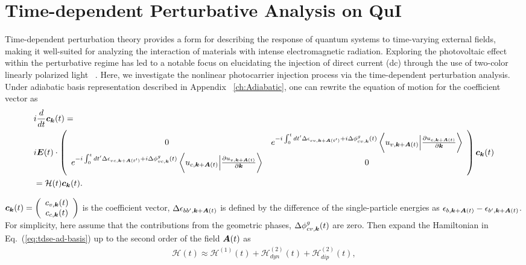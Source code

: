 \section{Time-dependent Perturbative Analysis on QuI \label{sec:deriveperturbation}}
Time-dependent perturbation theory provides a form for describing the response of quantum systems to time-varying external fields, making it well-suited for analyzing the interaction of materials with intense electromagnetic radiation. 
Exploring the photovoltaic effect within the perturbative regime has led to a notable focus on elucidating the injection of direct current (dc) through the use of two-color linearly polarized light ~\cite{PhysRevLett.74.3596,PhysRevLett.76.1703,PhysRevLett.78.306,Sun2010,PhysRevB.100.075202,HeideBoolakeeEcksteinHommelhoff+2021+3701+3707,PhysRevLett.123.067402}. 
Here, we investigate the nonlinear photocarrier injection process via the time-dependent perturbation analysis.
Under adiabatic basis representation described in Appendix ~\ref{ch:Adiabatic}, one can rewrite the equation of motion for the coefficient vector as
\begin{align}
&i\frac{d}{dt} \boldsymbol c_{\boldsymbol k}(t) = 
 \nonumber \\
& i\boldsymbol E(t)\cdot \left(
    \begin{array}{cc}
      0 & 
      e^{-i\int^t_0dt' \Delta \epsilon_{cv,\boldsymbol k+ \boldsymbol A(t')}+i \Delta \phi^g_{cv,\boldsymbol k}(t)} 
  \left \langle u_{v,\boldsymbol k+\boldsymbol A(t)}\Big |\frac{\partial u_{c,\boldsymbol k+\boldsymbol A(t)}}{\partial \boldsymbol k} \right \rangle \\
      e^{-i\int^t_0dt' \Delta \epsilon_{vc,\boldsymbol k+ \boldsymbol A(t')}+i \Delta \phi^g_{vc,\boldsymbol k}(t)} 
  \left \langle u_{c,\boldsymbol k+\boldsymbol A(t)}\Big |\frac{\partial u_{v,\boldsymbol k+\boldsymbol A(t)}}{\partial \boldsymbol k} \right \rangle &
      0
    \end{array}
    \right) \boldsymbol c_{\boldsymbol k}(t) \nonumber \\
&= \mathcal{H}(t) \boldsymbol c_{\boldsymbol k}(t)
.
\label{eq:tdse-ad-basis}
\end{align}

$\boldsymbol c_{\boldsymbol k}(t) = \left(
    \begin{array}{cc}
      c_{v,\boldsymbol k}(t) \\
      c_{c,\boldsymbol k}(t)
    \end{array}
    \right)$ is the coefficient vector,  $\Delta\epsilon_{bb',\boldsymbol k+ \boldsymbol A(t)}$ is defined by the difference of the single-particle energies as $\epsilon_{b,\boldsymbol k+ \boldsymbol A(t)}-\epsilon_{b',\boldsymbol k+ \boldsymbol A(t)}$. For simplicity, here assume that the contributions from the geometric phases, $\Delta \phi^g_{cv,\boldsymbol k}(t)$ are zero. Then expand the Hamiltonian in Eq.~(\ref{eq:tdse-ad-basis}) up to the second order of the field $\boldsymbol A(t)$ as
\begin{align}
\mathcal{H}(t)\approx \mathcal{H}^{(1)}(t) + \mathcal{H}^{(2)}_{dyn}(t) + \mathcal{H}^{(2)}_{dip}(t),
\end{align}

